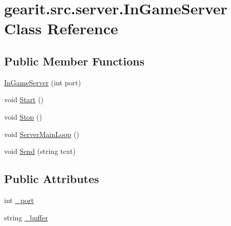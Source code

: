 \hypertarget{classgearit_1_1src_1_1server_1_1_in_game_server}{\section{gearit.\+src.\+server.\+In\+Game\+Server Class Reference}
\label{classgearit_1_1src_1_1server_1_1_in_game_server}
}
\subsection*{Public Member Functions}
\begin{DoxyCompactItemize}
\item 
\hyperlink{classgearit_1_1src_1_1server_1_1_in_game_server_a532e79bead040b07c68847bb0bd38259}{In\+Game\+Server} (int port)
\item 
void \hyperlink{classgearit_1_1src_1_1server_1_1_in_game_server_ae0baab07c1fdef920a350b2d978bdb38}{Start} ()
\item 
void \hyperlink{classgearit_1_1src_1_1server_1_1_in_game_server_a2b857581f9f9e3d3d14c98341c041d45}{Stop} ()
\item 
void \hyperlink{classgearit_1_1src_1_1server_1_1_in_game_server_a8453394a7d41bd7c7fd67d5e1aff61d3}{Server\+Main\+Loop} ()
\item 
void \hyperlink{classgearit_1_1src_1_1server_1_1_in_game_server_ae8390403ebb4d2eb7df4751d2147be2a}{Send} (string text)
\end{DoxyCompactItemize}
\subsection*{Public Attributes}
\begin{DoxyCompactItemize}
\item 
int \hyperlink{classgearit_1_1src_1_1server_1_1_in_game_server_adee4f666371edac66662b1a1ac4e95cd}{\+\_\+port}
\item 
string \hyperlink{classgearit_1_1src_1_1server_1_1_in_game_server_ae575de5f1b84bad7a5d01654fa5a5a78}{\+\_\+buffer}
\end{DoxyCompactItemize}


